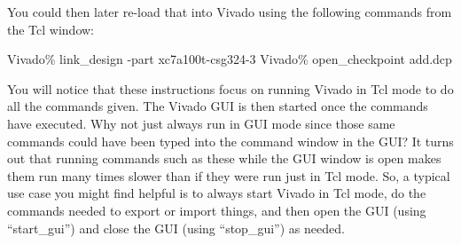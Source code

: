 You could then later re-load that into Vivado using the following commands from
the Tcl window:

\vspace{-0.15in}  \begin{code}
	Vivado\% link_design -part xc7a100t-csg324-3
	Vivado\% open_checkpoint add.dcp
\end{code}

You will notice that these instructions focus on running Vivado in Tcl mode to
do all the commands given.  The Vivado GUI is then started once the
commands have executed.  Why not just always run in GUI mode since those same
commands could have been typed into the command window in the GUI? It turns out
that running commands such as these while the GUI window is open makes them run
many times slower than if they were run just in Tcl mode.  So, a typical use
case you might find helpful is to always start Vivado in Tcl mode, do the
commands needed to export or import things, and then open the GUI (using
``start\_gui'') and close the GUI (using ``stop\_gui'') as needed.


